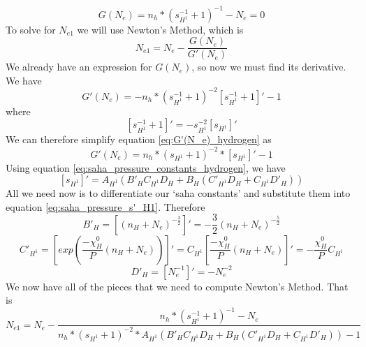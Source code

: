 \documentclass{article}
\begin{document}
			\begin{equation} \label{eq:G(N_e)_hydrogen}
				G(N_e) = n_h * \left( s_{H^1}^{-1} + 1 \right)^{-1} - N_e = 0
			\end{equation}
			To solve for $N_{e1}$ we will use Newton's Method, which is
			\begin{equation} \label{eq:N_e1_hydrogen}
				N_{e1} = N_e - \frac{G(N_e)}{G'(N_e)}
			\end{equation}
			We already have an expression for $G(N_e)$, so now we must find its derivative. We
			have
			\begin{equation} \label{eq:G'(N_e)_hydrogen}
				G'(N_e) = - n_h * \left( s_{H^1}^{-1} + 1 \right)^{-2} 
							\left[ s_{H^1}^{-1} + 1 \right]' - 1
			\end{equation}
			where
			\begin{equation} 
				\left[ s_{H^1}^{-1} + 1 \right]' = -s_{H^1}^{-2} \left[ s_{H^1} \right]' 
			\end{equation}
			We can therefore simplify equation \ref{eq:G'(N_e)_hydrogen} as 
			\begin{equation} \label{eq:G'(N_e)_hydrogen_simplified}
				G'(N_e) = n_h * \left( s_{H^1} + 1 \right)^{-2} * \left[ s_{H^1} \right]' - 1
			\end{equation}
			Using equation \ref{eq:saha_pressure_constants_hydrogen}, we have
			\begin{equation} \label{eq:saha_pressure_s'_H1}
				\left[ s_{H^1} \right]' = A_{H^{1}} (B'_H C_{H^1} D_H + 
					B_H ( C'_{H^1} D_H + C_{H^1} D'_H ) )
			\end{equation}
			All we need now is to differentiate our `saha constants' and substitute them into
			equation \ref{eq:saha_pressure_s'_H1}. Therefore
			\begin{equation} \label{eq:saha_pressure_B'_H}
				B'_H = \left[ (n_H + N_e)^{-\frac{3}{2}} \right]' 
							= -\frac{3}{2} (n_H + N_e)^{-\frac{5}{2}} 
			\end{equation}
			\begin{equation} \label{eq:saha_pressure_C'_H1}
				C'_{H^1} = \left[ exp\left(\frac{-\chi^0_H}{P} \left(n_H + N_e \right)\right) \right]'
									= C_{H^1} \left[ \frac{-\chi^0_H}{P} \left(n_H + N_e \right) \right]'
											= -\frac{\chi^0_H}{P} C_{H^1} 
			\end{equation}
			\begin{equation} \label{eq:saha_pressure_D'_H}
				D'_H = \left[ N_e^{-1} \right]' = -N_e^{-2} 
			\end{equation}
			We now have all of the pieces that we need to compute Newton's Method. That is
			\begin{equation} \label{eq:N_e1_hydrogen_full}
				N_{e1} = N_e - 
				\frac{ n_h * \left( s_{H^1}^{-1} + 1 \right)^{-1} - N_e }
								{ n_h * \left( s_{H^1} + 1 \right)^{-2} * 
									A_{H^{1}} (B'_H C_{H^1} D_H + B_H ( C'_{H^1} D_H + C_{H^1} D'_H ) ) - 1
								}
			\end{equation}
\end{document}
